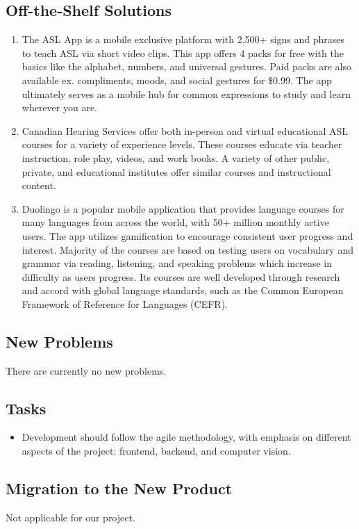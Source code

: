 \documentclass[12pt, titlepage]{article}
\begin{document}
\subsection{Off-the-Shelf Solutions}
\begin{enumerate}
    \item The ASL App is a mobile exclusive platform with 2,500+ signs and phrases to teach ASL via short video clips. This app offers 4 packs for free with the basics like the alphabet, numbers, and universal gestures. Paid packs are also available ex. compliments, moods, and social gestures for \$0.99. The app ultimately serves as a mobile hub for common expressions to study and learn wherever you are.
    \item Canadian Hearing Services offer both in-person and virtual educational ASL courses for a variety of experience levels. These courses educate via teacher instruction, role play, videos, and work books. A variety of other public, private, and educational institutes offer similar courses and instructional content.
    \item Duolingo is a popular mobile application that provides language courses for many languages from across the world, with 50+ million monthly active users. The app utilizes gamification to encourage consistent user progress and interest. Majority of the courses are based on testing users on vocabulary and grammar via reading, listening, and speaking problems which increase in difficulty as users progress. Its courses are well developed through research and accord with global language standards, such as the Common European Framework of Reference for Languages (CEFR).
\end{enumerate}

\subsection{New Problems}
There are currently no new problems.

\subsection{Tasks}
\begin{itemize}
    \item Development should follow the agile methodology, with emphasis on different aspects of the project: frontend, backend, and computer vision.
\end{itemize}

\subsection{Migration to the New Product}
Not applicable for our project.
\end{document}

